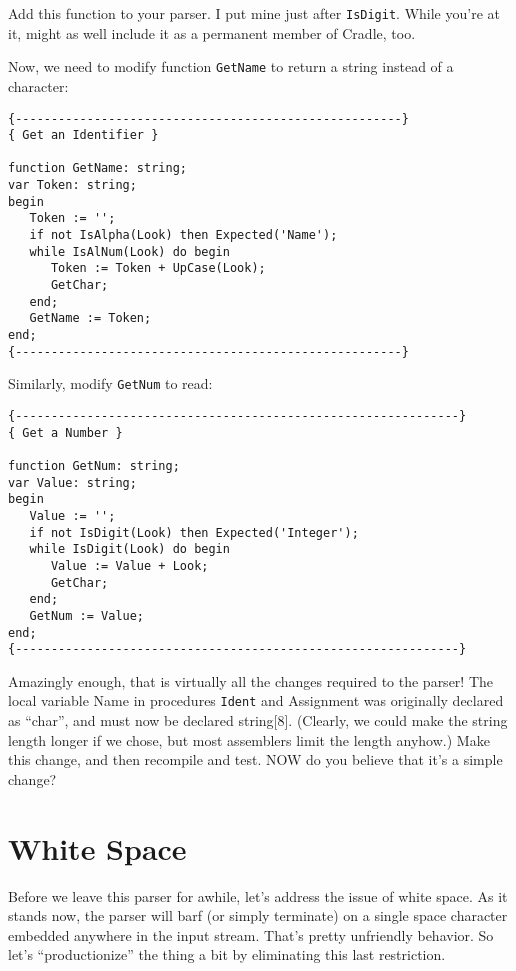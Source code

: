 Add this function to your parser. I put mine just after {\tt IsDigit}. While you're  at  it, might  as  well  include it as a permanent member of Cradle, too.

Now, we need  to  modify  function  {\tt GetName}  to  return  a string instead of a character:

\begin{verbatim}
{------------------------------------------------------}
{ Get an Identifier }

function GetName: string;
var Token: string;
begin
   Token := '';
   if not IsAlpha(Look) then Expected('Name');
   while IsAlNum(Look) do begin
      Token := Token + UpCase(Look);
      GetChar;
   end;
   GetName := Token;
end;
{------------------------------------------------------}
\end{verbatim}

Similarly, modify {\tt GetNum} to read:

\begin{verbatim}
{--------------------------------------------------------------}
{ Get a Number }

function GetNum: string;
var Value: string;
begin
   Value := '';
   if not IsDigit(Look) then Expected('Integer');
   while IsDigit(Look) do begin
      Value := Value + Look;
      GetChar;
   end;
   GetNum := Value;
end;
{--------------------------------------------------------------}
\end{verbatim}

Amazingly enough, that  is  virtually all the changes required to the  parser!  The local variable Name  in  procedures  {\tt Ident}  and Assignment was originally declared as  ``char'', and  must  now be declared string[8]. (Clearly, we  could  make the string length longer if we chose, but most assemblers limit the length anyhow.) Make  this  change, and  then  recompile and test.  NOW  do  you believe that it's a simple change?

\section{White Space}

Before we leave this parser for awhile, let's  address  the issue of  white  space. As it stands now, the parser  will  barf  (or simply terminate) on a single space  character  embedded anywhere in  the input stream. That's pretty  unfriendly  behavior. So let's ``productionize'' the thing  a  bit  by eliminating this last restriction.

